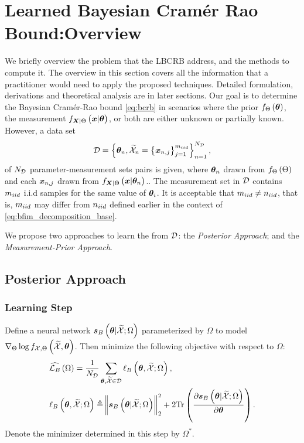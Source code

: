 \section{Learned Bayesian Cram\'er Rao Bound:Overview}\label{sec:lbcrb_method}
We briefly %
overview the problem that the LBCRB address, and the methods to compute it. {The  overview in this section covers all the information that a practitioner would need to apply the proposed techniques. Detailed formulation, derivations and theoretical analysis are in later sections.}
Our goal is to determine the Bayesian Cram\'er-Rao bound \eqref{eq:bcrb}
in scenarios where the prior $f_{\Theta}\left(\bm{\theta}\right)$, the measurement $\probt{\x|\p}{\X|\pr}$, or both are either
unknown or partially known. However, a data set 
\begin{equation}\label{eq:dataset_rel}
 \ds=\set{\p_n, \xsetr_n=\set{{\x}_{n,j}}_{j=1}^{\niiddata}   }_{%
 {n=1}}^{\nds},
\end{equation}
of $N_{\mathcal{D}}$ parameter-measurement sets pairs is given,
{where  $\bm{\theta}_n$ drawn from $f_{\Theta}\left(\Theta\right)$ and  each $\bm{x}_{n,j}$ drawn from $\probt{\x|\p_n}{\X|\pr}$.}. 
{The measurement set in $\mathcal{D}$ contains $m_{iid}$ i.i.d samples %
{for} the same value of $\bm{\theta}_i$.} 
{It is acceptable that $m_{iid}\neq n_{iid}$, that is, 
$m_{iid}$  may differ from $n_{iid}$ defined earlier in the context of \eqref{eq:bfim_decomposition_base}}.

We %
propose two approaches %
{to learn the \name{} from $\mathcal{D}$:}
 the \emph{Posterior Approach}; and the \emph{Measurement-Prior Approach}.
 
\subsection{Posterior Approach}
\subsubsection{\textbf{Learning Step}} Define a neural network $\bm{s}_{B}\left(\bm{\theta}|\widetilde{\mathcal{X}};\Omega\right)$ 
 parameterized by $\Omega$ 
{to {model} $\nabla_{\Theta}\log f_{\mathcal{X},\Theta}\left(\widetilde{\mathcal{X}},\bm{\theta}\right)$.} Then minimize the following objective %
 {with respect to $\Omega$}:
\begin{align}\label{eq:score_post_mean}
     &\widehat{\mathcal{L}_{B}}\left(\Omega\right)=\frac{1}{N_{\mathcal{D}}}\sum_{\bm{\theta},\widetilde{\mathcal{X}}\in\mathcal{D}}\ell_B\left(\bm{\theta},\widetilde{\mathcal{X}};\Omega\right),\\
     &\ell_B\left(\bm{\theta},\widetilde{\mathcal{X}};\Omega\right)\triangleq\norm{\bm{s}_{B}\left(\bm{\theta}|\widetilde{\mathcal{X}};\Omega\right)}_2^2+2\mathrm{Tr}\left({\frac{\partial \bm{s}_{B}\left(\bm{\theta}|\widetilde{\mathcal{X}};\Omega\right)}{\partial\bm{\theta}}}\right).\nonumber
 \end{align}
{Denote the minimizer determined in this step by $\Omega^*$.}

